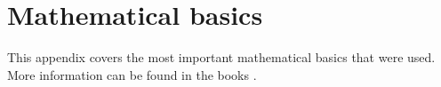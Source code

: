 \chapter{Mathematical basics}
This appendix covers the most important mathematical basics that were used. More information can be found in the books \cite{Schwarz:2011, Rudolf:2014, Taschner:2014, Taschner:2015, Kugi:2021}.



